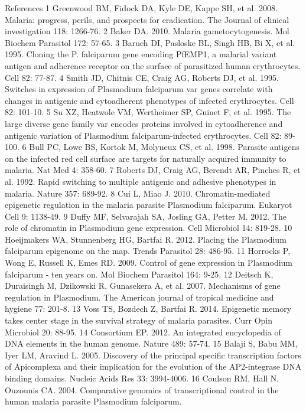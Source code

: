 References
1 Greenwood BM, Fidock DA, Kyle DE, Kappe SH, et al. 2008. Malaria: progress,
perils, and prospects for eradication. The Journal of clinical investigation
118: 1266-76.
2 Baker DA. 2010. Malaria gametocytogenesis. Mol Biochem Parasitol 172: 57-65.
3 Baruch DI, Pasloske BL, Singh HB, Bi X, et al. 1995. Cloning the P.
falciparum gene encoding PfEMP1, a malarial variant antigen and adherence
receptor on the surface of parasitized human erythrocytes. Cell 82: 77-87.
4 Smith JD, Chitnis CE, Craig AG, Roberts DJ, et al. 1995. Switches in
expression of Plasmodium falciparum var genes correlate with changes in
antigenic and cytoadherent phenotypes of infected erythrocytes. Cell 82:
101-10.
5 Su XZ, Heatwole VM, Wertheimer SP, Guinet F, et al. 1995. The large diverse
gene family var encodes proteins involved in cytoadherence and antigenic
variation of Plasmodium falciparum-infected erythrocytes. Cell 82: 89-100.
6 Bull PC, Lowe BS, Kortok M, Molyneux CS, et al. 1998. Parasite antigens on
the infected red cell surface are targets for naturally acquired immunity to
malaria. Nat Med 4: 358-60.
7 Roberts DJ, Craig AG, Berendt AR, Pinches R, et al. 1992. Rapid switching to
multiple antigenic and adhesive phenotypes in malaria. Nature 357: 689-92.
8 Cui L, Miao J. 2010. Chromatin-mediated epigenetic regulation in the malaria
parasite Plasmodium falciparum. Eukaryot Cell 9: 1138-49.
9 Duffy MF, Selvarajah SA, Josling GA, Petter M. 2012. The role of chromatin
in Plasmodium gene expression. Cell Microbiol 14: 819-28.
10  Hoeijmakers WA, Stunnenberg HG, Bartfai R. 2012. Placing the Plasmodium
falciparum epigenome on the map. Trends Parasitol 28: 486-95.
11  Horrocks P, Wong E, Russell K, Emes RD. 2009. Control of gene expression
in Plasmodium falciparum - ten years on. Mol Biochem Parasitol 164: 9-25.
12  Deitsch K, Duraisingh M, Dzikowski R, Gunasekera A, et al. 2007.
Mechanisms of gene regulation in Plasmodium. The American journal of tropical
medicine and hygiene 77: 201-8.
13  Voss TS, Bozdech Z, Bartfai R. 2014. Epigenetic memory takes center stage
in the survival strategy of malaria parasites. Curr Opin Microbiol 20: 88-95.
14  Consortium EP. 2012. An integrated encyclopedia of DNA elements in the
human genome. Nature 489: 57-74.
15  Balaji S, Babu MM, Iyer LM, Aravind L. 2005. Discovery of the principal
specific transcription factors of Apicomplexa and their implication for the
evolution of the AP2-integrase DNA binding domains. Nucleic Acids Res 33:
3994-4006.
16  Coulson RM, Hall N, Ouzounis CA. 2004. Comparative genomics of
transcriptional control in the human malaria parasite Plasmodium falciparum.
